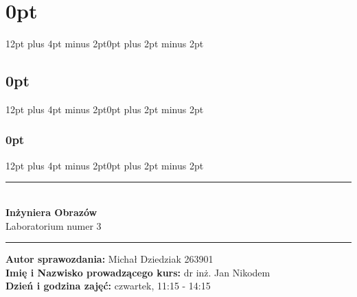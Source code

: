 % 
% 

\usepackage[margin = 0.7in]{geometry}
\usepackage{graphicx}
\usepackage{graphics}
\usepackage[T1]{fontenc}
\usepackage[polish]{babel}
\usepackage{cmap}
\usepackage[utf8]{inputenc}
\usepackage{float}
\usepackage{tabularx}
\usepackage[table,xcdraw]{xcolor}
\usepackage{lipsum}
\usepackage{titlesec}
\usepackage{minted}
\usepackage{xcolor}
\usepackage{caption}
\usepackage{enumitem}
\usepackage{csvsimple}
\usepackage{natbib}
\usepackage{blindtext}

\usepackage{amsmath} %

\usepackage{numprint} %
\usepackage[round-precision=3,round-mode=figures, scientific-notation=true]{siunitx} %

\usepackage[hidelinks]{hyperref}
\usepackage{url}

\usepackage{bm} %


\usepackage[]{booktabs}
\usepackage{tabularray}
\usepackage{multirow}

\author{Michał Dziedziak}
\date{\today}


\titlespacing\section{0pt}{12pt plus 4pt minus 2pt}{0pt plus 2pt minus 2pt}
\titlespacing\subsection{0pt}{12pt plus 4pt minus 2pt}{0pt plus 2pt minus 2pt}
\titlespacing\subsubsection{0pt}{12pt plus 4pt minus 2pt}{0pt plus 2pt minus 2pt}
\setlength{\parskip}{\baselineskip}%
\setlength{\parindent}{0pt}%

\newcommand{\squeezeup}{\vspace{-5mm}}




\begin{titlepage}
    \begin{center}
        \vspace*{5cm}
        \rule{500pt}{1pt}\\
        \vspace*{0.5cm}
        \LARGE
        \textbf{Inżyniera Obrazów}\\
        \Large
        Laboratorium numer 3
        \vspace*{0.5cm}
        \rule{500pt}{1pt}
    \end{center}

    \vspace*{10cm}

    {\raggedright
        \large
        \textbf{Autor sprawozdania:} Michał Dziedziak 263901\\
        \textbf{Imię i Nazwisko prowadzącego kurs:} dr inż. Jan Nikodem\\
        \textbf{Dzień i godzina zajęć:} czwartek, 11:15 - 14:15
    }
\end{titlepage}



